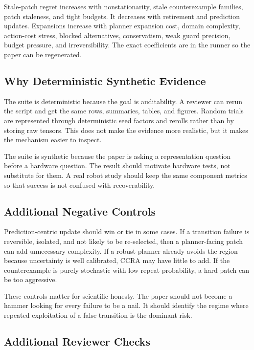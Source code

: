 \documentclass{article}
\newcommand{\ccra}{\textsc{CCRA}}
\begin{document}
Stale-patch regret increases with nonstationarity, stale counterexample
families, patch staleness, and tight budgets. It decreases with retirement and
prediction updates. Expansions increase with planner expansion cost, domain
complexity, action-cost stress, blocked alternatives, conservatism, weak guard
precision, budget pressure, and irreversibility. The exact coefficients are in
the runner so the paper can be regenerated.

\subsection{Why Deterministic Synthetic Evidence}

The suite is deterministic because the goal is auditability. A reviewer can
rerun the script and get the same rows, summaries, tables, and figures. Random
trials are represented through deterministic seed factors and rerolls rather
than by storing raw tensors. This does not make the evidence more realistic,
but it makes the mechanism easier to inspect.

The suite is synthetic because the paper is asking a representation question
before a hardware question. The result should motivate hardware tests, not
substitute for them. A real robot study should keep the same component metrics
so that success is not confused with recoverability.

\subsection{Additional Negative Controls}

Prediction-centric update should win or tie in some cases. If a transition
failure is reversible, isolated, and not likely to be re-selected, then a
planner-facing patch can add unnecessary complexity. If a robust planner
already avoids the region because uncertainty is well calibrated, \ccra{} may
have little to add. If the counterexample is purely stochastic with low repeat
probability, a hard patch can be too aggressive.

These controls matter for scientific honesty. The paper should not become a
hammer looking for every failure to be a nail. It should identify the regime
where repeated exploitation of a false transition is the dominant risk.

\subsection{Additional Reviewer Checks}
\end{document}
